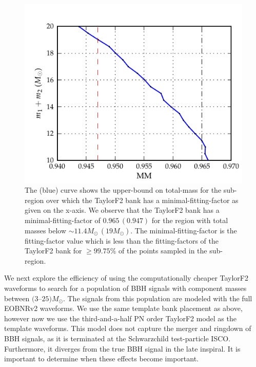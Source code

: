 \begin{figure}
\centering
\includegraphics[scale=0.04, clip=false, keepaspectratio=true, width=\columnwidth]{figures/eobpnmetric/EOB22vsF2totalMassvsMMs-PRD.pdf} %

\caption{\label{fig:mmvsM_f2eob22}The (blue) curve shows the upper-bound 
on total-mass for the sub-region over which the TaylorF2 bank has a 
minimal-fitting-factor as given on the x-axis. We observe that the TaylorF2 
bank has a minimal-fitting-factor of $0.965\,(0.947)$ for the region with total
masses below $\sim 11.4 M_{\odot}\,(19 M_{\odot})$. The minimal-fitting-factor
is the fitting-factor value which is less than the fitting-factors of the 
TaylorF2 bank for $\geq 99.75\%$ of the points sampled in the sub-region.}
\end{figure}

We next explore the efficiency of using the computationally cheaper TaylorF2
waveforms to search for a population of BBH signals with
component masses between $(3$--$25) M_\odot$. The signals from this population
are modeled 
with the full EOBNRv2 waveforms. We use the same template bank placement as above,
however now we use the third-and-a-half PN order TaylorF2 model as the
template waveforms. This model does not capture the merger and ringdown of BBH
signals, as it is terminated at the Schwarzchild test-particle ISCO.
Furthermore, it diverges from the true BBH signal in the late inspiral.
It is important to determine when these effects become important.


